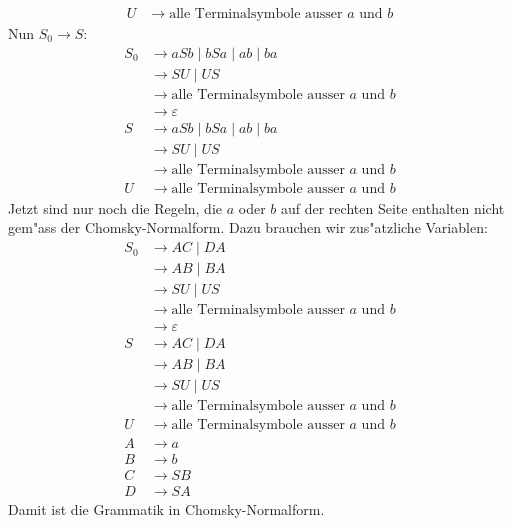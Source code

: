 \begin{loesung}
\begin{teilaufgaben}
\begin{align*}
U  &\rightarrow \text{alle Terminalsymbole ausser $a$ und $b$}
\end{align*}
Nun $S_0\rightarrow S$:
\begin{align*}
S_0&\rightarrow aSb\;|\; bSa\;|\;ab\;|\;ba\\
   &\rightarrow SU \;|\; US\\
   &\rightarrow \text{alle Terminalsymbole ausser $a$ und $b$}\\
   &\rightarrow \varepsilon\\
S  &\rightarrow aSb\;|\; bSa\;|\;ab\;|\;ba\\
   &\rightarrow SU \;|\; US\\
   &\rightarrow \text{alle Terminalsymbole ausser $a$ und $b$}\\
U  &\rightarrow \text{alle Terminalsymbole ausser $a$ und $b$}
\end{align*}
Jetzt sind nur noch die Regeln, die $a$ oder $b$ auf der rechten
Seite enthalten nicht gem"ass der Chomsky-Normalform.
Dazu brauchen wir zus"atzliche Variablen:
\begin{align*}
S_0&\rightarrow AC\;|\; DA \\
   &\rightarrow AB\;|\;BA\\
   &\rightarrow SU \;|\; US\\
   &\rightarrow \text{alle Terminalsymbole ausser $a$ und $b$}\\
   &\rightarrow \varepsilon\\
S  &\rightarrow AC\;|\; DA \\
   &\rightarrow AB\;|\;BA\\
   &\rightarrow SU \;|\; US\\
   &\rightarrow \text{alle Terminalsymbole ausser $a$ und $b$}\\
U  &\rightarrow \text{alle Terminalsymbole ausser $a$ und $b$}\\
A  &\rightarrow a \\
B  &\rightarrow b \\
C  &\rightarrow SB \\
D  &\rightarrow SA
\end{align*}
Damit ist die Grammatik in Chomsky-Normalform.
\qedhere
\end{teilaufgaben}
\end{loesung}

